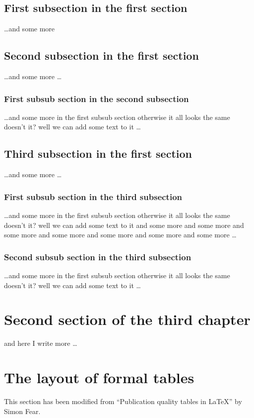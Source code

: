 \documentclass[a4paper,12pt,times,print,index, custombib]{PhDThesisPSnPDF}\usepackage[]{graphicx}\usepackage[]{color}
\begin{document}
\subsection{First subsection in the first section}
\dots and some more 

\subsection{Second subsection in the first section}
\dots and some more \dots

\subsubsection{First subsub section in the second subsection}
\dots and some more in the first subsub section otherwise it all looks the same
doesn't it? well we can add some text to it \dots

\subsection{Third subsection in the first section}
\dots and some more \dots

\subsubsection{First subsub section in the third subsection}
\dots and some more in the first subsub section otherwise it all looks the same
doesn't it? well we can add some text to it and some more and some more and
some more and some more and some more and some more and some more \dots

\subsubsection{Second subsub section in the third subsection}
\dots and some more in the first subsub section otherwise it all looks the same
doesn't it? well we can add some text to it \dots

\section{Second section of the third chapter}
and here I write more \dots

\section{The layout of formal tables}
This section has been modified from ``Publication quality tables in \LaTeX*''
 by Simon Fear.
\end{document}
